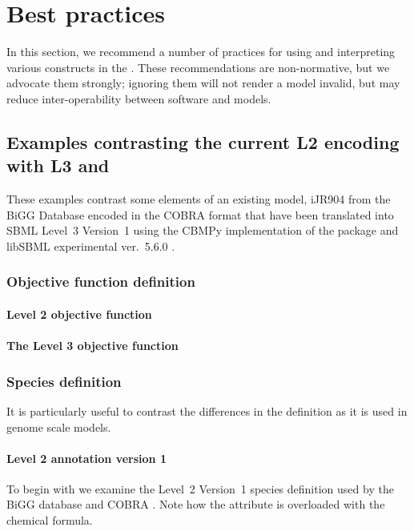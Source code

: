 
\section{Best practices}
\label{best-practices}

In this section, we recommend a number of practices for using and
interpreting various constructs in the \FBCPackage.
These recommendations are non-normative, but we advocate them strongly;
ignoring them will not render a model invalid, but may reduce
inter-operability between software and models.

\subsection{Examples contrasting the current \SBML L2 encoding with L3 and \FBC}
These examples contrast some elements of an existing model, iJR904 from the \textsf{BiGG} Database encoded in the \textsf{COBRA} format \cite{ijr904, bigg, cobra} that have been translated into SBML Level~3 Version~1 using the \textsf{CBMPy} implementation of the \FBC package \cite{pysces, cbmpy} and \textsf{libSBML} experimental ver.~5.6.0 \cite{libsbml}.

\subsubsection*{Objective function definition}
\paragraph{\SBML Level 2 objective function}

\paragraph{The \SBML Level 3 objective function}
\protect{}

\subsubsection*{Species definition}
It is particularly useful to contrast the differences in the \Species definition as it is used in genome scale models.

\paragraph{\SBML Level 2 \Species annotation version 1}
To begin with we examine the \SBML Level~2 Version~1 species definition used by the BiGG database and \textsf{COBRA} \cite{bigg, cobra}. Note how the  attribute is overloaded with the chemical formula.
%

